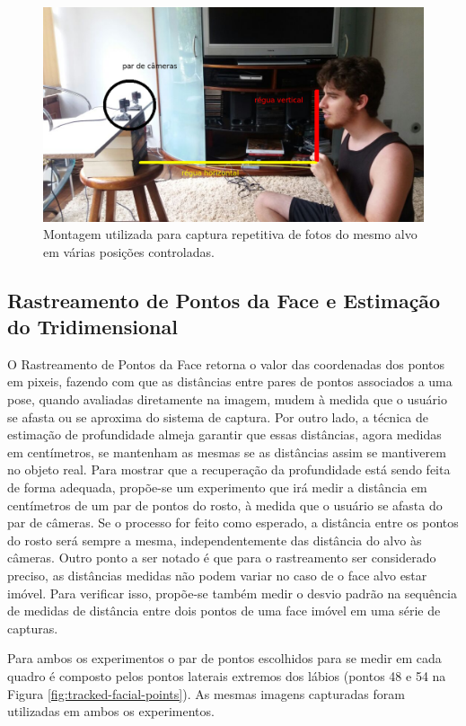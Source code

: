 \begin{figure}
\centering
\includegraphics[width=0.8\linewidth]{figs/setupExperimento-comentado.png}
\caption{Montagem utilizada para captura repetitiva de fotos do mesmo alvo em várias posições controladas.}
\label{fig:exp-montagem}
\end{figure}

\subsection{Rastreamento de Pontos da Face e Estimação do Tridimensional}

O Rastreamento de Pontos da Face retorna o valor das coordenadas dos pontos em
pixeis, fazendo com que as distâncias entre pares de pontos associados a uma
pose, quando avaliadas diretamente na imagem, mudem à medida que o usuário se
afasta ou se aproxima do sistema de captura. Por outro lado, a técnica de
estimação de profundidade almeja garantir que essas distâncias, agora medidas em
centímetros, se mantenham as mesmas se as distâncias assim se mantiverem no
objeto real. Para mostrar que a recuperação da profundidade está sendo feita de
forma adequada, propõe-se um experimento que irá medir a distância em
centímetros de um par de pontos do rosto, à medida que o usuário se afasta do
par de câmeras. Se o processo for feito como esperado, a distância entre os
pontos do rosto será sempre a mesma, independentemente das distância do alvo às
câmeras.  Outro ponto a ser notado é que para o rastreamento ser considerado
preciso, as distâncias medidas não podem variar no caso de o face alvo estar
imóvel. Para verificar isso, propõe-se também medir o desvio padrão na sequência
de medidas de distância entre dois pontos de uma face imóvel em uma série de
capturas.


Para ambos os experimentos o par de pontos escolhidos para se medir em cada
quadro é composto pelos pontos laterais extremos dos lábios (pontos 48 e 54 na
Figura \ref{fig:tracked-facial-points}). As mesmas imagens capturadas foram
utilizadas em ambos os experimentos.

